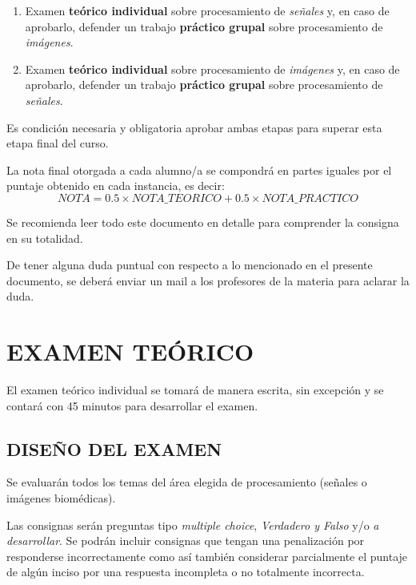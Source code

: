 \documentclass[10pt]{article}
\begin{document}
\begin{enumerate}
    \item Examen \textbf{teórico individual} sobre procesamiento de \textit{señales} y, en caso de aprobarlo, defender un trabajo \textbf{práctico grupal} sobre procesamiento de \textit{imágenes}.

    \item Examen \textbf{teórico individual} sobre procesamiento de \textit{imágenes} y, en caso de aprobarlo, defender un trabajo \textbf{práctico grupal} sobre procesamiento de \textit{señales}.
\end{enumerate}

Es condición necesaria y obligatoria aprobar ambas etapas para superar esta etapa final del curso.
\vspace{0.25cm}

La nota final otorgada a cada alumno/a se compondrá en partes iguales por el puntaje obtenido en cada instancia, es decir:
\begin{equation*}
    NOTA = 0.5 \times NOTA\_TEORICO + 0.5 \times NOTA\_PRACTICO
\end{equation*}
\vspace{0.25cm}

Se recomienda leer todo este documento en detalle para comprender la consigna en su totalidad.
\vspace{0.25cm}

De tener alguna duda puntual con respecto a lo mencionado en el presente documento, se deberá enviar un mail a los profesores de la materia para aclarar la duda.

\newpage
\section*{EXAMEN TEÓRICO}

El examen teórico individual se tomará de manera escrita, sin excepción y se contará con 45 minutos para desarrollar el examen.

\subsection*{DISEÑO DEL EXAMEN}
Se evaluarán todos los temas del área elegida de procesamiento (señales o imágenes biomédicas). 
\vspace{0.25cm}

Las consignas serán preguntas tipo \textit{multiple choice}, \textit{Verdadero y Falso} y/o \textit{a desarrollar}.
Se podrán incluir consignas que tengan una penalización por responderse incorrectamente como así también considerar parcialmente el puntaje de algún inciso por una respuesta incompleta o no totalmente incorrecta. 
\vspace{0.35cm}
\end{document}
